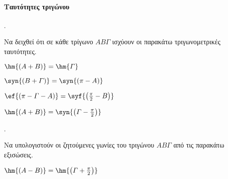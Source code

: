 \documentclass[11pt,a4paper,twocolumn]{article}
\newcounter{askhsh}
\newcommand{\askhsh}{\large\theaskhsh.\ \addtocounter{askhsh}{1}}
\begin{document}
\paragraph{Ταυτότητες τριγώνου}
\askhsh
Να δειχθεί ότι σε κάθε τρίγωνο $ AB\varGamma $ ισχύουν οι παρακάτω τριγωνομετρικές ταυτότητες.
\begin{alist}
\item $ \hm{(A+B)}=\hm{\varGamma} $
\item $ \syn{(B+\varGamma)}=\syn{(\pi-A)} $
\item $ \ef{(\pi-\varGamma-A)}=\syf{\left(\frac{\pi}{2}-B\right) } $
\item $ \hm{(A+B)}=\syn{\left(\varGamma-\frac{\pi}{2}\right) } $
\end{alist}
\askhsh
Να υπολογιστούν οι ζητούμενες γωνίες του τριγώνου $ AB\varGamma $ από τις παρακάτω εξισώσεις.
\begin{alist}
\item $ \hm{(A-B)}=\hm{\left(\varGamma+\frac{\pi}{2} \right) } $
\end{alist}
\end{document}
